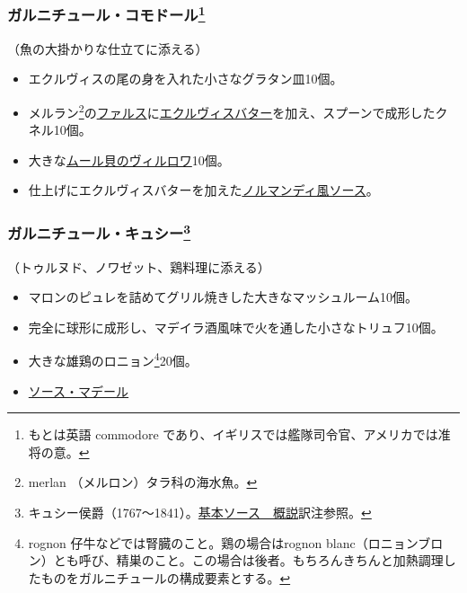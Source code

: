 \begin{recette}
\hypertarget{garniture-a-la-commodore}{%
\subsubsection[ガルニチュール・コモドール]{\texorpdfstring{ガルニチュール・コモドール\footnote{もとは英語
  commodore であり、イギリスでは艦隊司令官、アメリカでは准将の意。}}{ガルニチュール・コモドール}}\label{garniture-a-la-commodore}}



（魚の大掛かりな仕立てに添える）

\begin{itemize}
\item
  エクルヴィスの尾の身を入れた小さなグラタン皿10個。
\item
  メルラン\footnote{merlan （メルロン）タラ科の海水魚。}の\protect\hyperlink{farce-a}{ファルス}に\protect\hyperlink{beurre-d-ecrevissse}{エクルヴィスバター}を加え、スプーンで成形したクネル10個。
\item
  大きな\protect\hyperlink{moules-a-la-villeroy}{ムール貝のヴィルロワ}10個。
\item
  仕上げにエクルヴィスバターを加えた\protect\hyperlink{sauce-normande}{ノルマンディ風ソース}。
\end{itemize}

\hypertarget{garniture-cussy}{%
\subsubsection[ガルニチュール・キュシー]{\texorpdfstring{ガルニチュール・キュシー\footnote{キュシー侯爵（1767〜1841）。\protect\hyperlink{osbservation-sur-la-sauce}{基本ソース　概説}訳注参照。}}{ガルニチュール・キュシー}}\label{garniture-cussy}}



（トゥルヌド、ノワゼット、鶏料理に添える）

\begin{itemize}
\item
  マロンのピュレを詰めてグリル焼きした大きなマッシュルーム10個。
\item
  完全に球形に成形し、マデイラ酒風味で火を通した小さなトリュフ10個。
\item
  大きな雄鶏のロニョン\footnote{rognon
    仔牛などでは腎臓のこと。鶏の場合はrognon
    blanc（ロニョンブロン）とも呼び、精巣のこと。この場合は後者。もちろんきちんと加熱調理したものをガルニチュールの構成要素とする。}20個。
\item
  \protect\hyperlink{sauce-madere}{ソース・マデール}
\end{itemize}


\end{recette}

